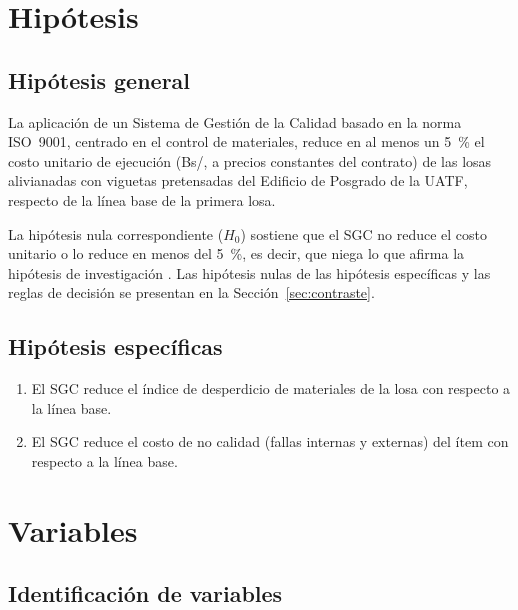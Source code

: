 \section{Hipótesis}

\subsection{Hipótesis general}
La aplicación de un Sistema de Gestión de la Calidad basado en la norma ISO~9001, centrado en el control de materiales, reduce en al menos un 5~\% el costo unitario de ejecución (Bs/\mdos{}, a precios constantes del contrato) de las losas alivianadas con viguetas pretensadas del Edificio de Posgrado de la UATF, respecto de la línea base de la primera losa.

La hipótesis nula correspondiente ($H_0$) sostiene que el SGC no reduce el costo unitario o lo reduce en menos del 5~\%, es decir, que niega lo que afirma la hipótesis de investigación \parencite[p.~133]{hernandez2018}. Las hipótesis nulas de las hipótesis específicas y las reglas de decisión se presentan en la Sección~\ref{sec:contraste}.

\subsection{Hipótesis específicas}
\begin{enumerate}[label=\textbf{HE\arabic*.}]
  \item El SGC reduce el índice de desperdicio de materiales de la losa con respecto a la línea base.
  \item El SGC reduce el costo de no calidad (fallas internas y externas) del ítem con respecto a la línea base.
\end{enumerate}

\section{Variables}

\subsection{Identificación de variables}

